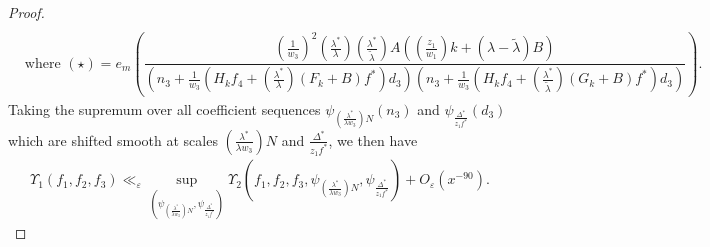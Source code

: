 \documentclass{amsart}
\numberwithin{equation}{section}
\begin{document}
\begin{proof}
\begin{align*}
 \\
&\mbox{where } (\star) = e_{m}\left(\dfrac{(\frac{1}{w_3})^2(\frac{\lambda^*}{\lambda})(\frac{\lambda^*}{\widetilde{\lambda}})A ((\frac{z_1}{w_1}) k   +  (\lambda-\widetilde{\lambda})B)}{( n_3+\frac{1}{w_3}(H_kf_4 + (\frac{\lambda^*}{\lambda}) (F_k +B )f^*) d_3)(  n_3+\frac{1}{w_3}(H_kf_4 + ( \frac{\lambda^*}{\widetilde{\lambda}})(G_k+B) f^*) d_3)}\right).
\end{align*}
Taking the supremum over all coefficient sequences $\psi_{(\frac{\lambda^*}{\lambda w_3})N}(n_3)$ and $\psi_{\frac{\Delta^*}{z_1 f^*}}(d_3)$ which are shifted smooth at scales $(\frac{\lambda^*}{\lambda w_3})N$ and $\frac{\Delta^*}{z_1 f^*}$, we then  have
\begin{align}\label{chain2}
\Upsilon_1(f_1,f_2,f_3) \ll_\varepsilon \sup_{(\psi_{(\frac{\lambda^*}{\lambda w_3})N},\psi_{\frac{\Delta^*}{z_1 f^*}})}\Upsilon_2(f_1,f_2,f_3,\psi_{(\frac{\lambda^*}{\lambda w_3})N},\psi_{\frac{\Delta^*}{z_1 f^*}}) + O_\varepsilon(x^{-90}).
\end{align} 



\end{proof}
\end{document}
